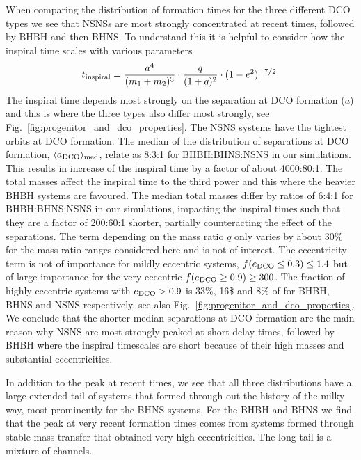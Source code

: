 When comparing the distribution of formation times for the three different DCO types we see that NSNSs are most strongly concentrated at recent times, followed by BHBH and then BHNS. To understand this it is helpful to consider how the inspiral time scales with various parameters
\begin{equation}
    t_{\rm inspiral} = \frac{a^4}{(m_1 + m_2)^{3}} \cdot \frac{q}{(1+q)^2} \cdot (1 - e^2)^{-7/2}.
\end{equation}
The inspiral time depends most strongly on the separation at DCO formation ($a$) and this is where the three types also differ most strongly, see Fig.~\ref{fig:progenitor_and_dco_properties}. The NSNS systems have the tightest orbits at DCO formation. The median of the distribution of separations at DCO formation, $\langle a_{\rm DCO} \rangle_{\rm med}$, relate as 8:3:1 for BHBH:BHNS:NSNS in our simulations. This results in increase of the inspiral time by a factor of about 4000:80:1. The total masses affect the inspiral time to the third power and this where the heavier BHBH systems are favoured. The median total masses differ by ratios of 6:4:1 for BHBH:BHNS:NSNS in our simulations, impacting the inspiral times such that they are a factor of 200:60:1 shorter, partially counteracting the effect of the separations. The term depending on the mass ratio $q$ only varies by about 30\% for the mass ratio ranges considered here and is not of interest. The eccentricity term is not of importance for mildly eccentric systems, $f(e_{\rm DCO} \le 0.3)  \le 1.4$ but of large importance for the very eccentric  $f(e_{\rm DCO} \ge 0.9) \ge 300$. The fraction of highly eccentric systems with $e_{\rm DCO}>0.9$ is 33\%, 16\$ and 8\% of for BHBH, BHNS and NSNS respectively, see also Fig.~\ref{fig:progenitor_and_dco_properties}. 
%
We conclude that the shorter median separations at DCO formation are the main reason why NSNS are most strongly peaked at short delay times, followed by BHBH where the inspiral timescales are short because of their high masses and substantial eccentricities. 

In addition to the peak at recent times, we see that all three distributions have a large extended tail of systems that formed through out the history of the milky way, most prominently for the BHNS systems.  For the BHBH and BHNS we find that the peak at very recent formation times comes from systems formed through stable mass transfer that obtained very high eccentricities. The long tail is a mixture of channels.   


